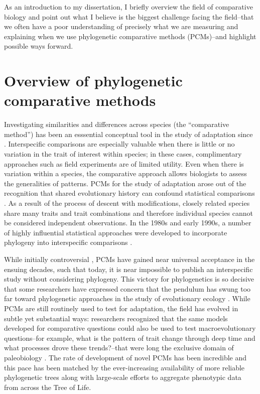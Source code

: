 As an introduction to my dissertation, I briefly overview the field of comparative biology \citep[for a more comprehensive discussion, see][]{PennellHarmon} and point out what I believe is the biggest challenge facing the field--that we often have a poor understanding of precisely what we are measuring and explaining when we use phylogenetic comparative methods (PCMs)--and highlight possible ways forward.

\section{Overview of phylogenetic comparative methods}

Investigating similarities and differences across species (the ``comparative method'') has been an esssential conceptual tool in the study of adaptation since \citet{Darwin1859}. Interspecific comparisons are especially valuable when there is little or no variation in the trait of interest within species; in these cases, complimentary approaches such as field experiments are of limited utility. Even when there is variation within a species, the comparative approach allows biologists to assess the generalities of patterns. PCMs for the study of adaptation arose out of the recognition that shared evolutionary history can confound statistical comparisons \citep{HarveyPagel1991}. As a result of the process of descent with modifications, closely related species share many traits and trait combinations and therefore individual species cannot be considered independent observations. In the 1980s and early 1990s, a number of highly influential statistical approaches were developed to incorporate phylogeny into interspecific comparisons \citep{Ridley1983, Felsenstein1985, Grafen1989, Maddison1990, HarveyPagel1991, Lynch1991, Pagel1994}. 

While initially controversial \citep[e.g.,][]{Westoby1995}, PCMs have gained near universal acceptance in the ensuing decades, such that today, it is near impossible to publish an interspecific study without considering phylogeny. This victory for phylogenetics is so decisive that some researchers have expressed concern that the pendulum has swung too far toward phylogenetic approaches in the study of evolutionary ecology \citep{Losos2011}. While PCMs are still routinely used to test for adaptation, the field has evolved in subtle yet substantial ways: researchers recognized that the same models developed for comparative questions could also be used to test macroevolutionary questions--for example, what is the pattern of trait change through deep time and what processes drove these trends?--that were long the exclusive domain of paleobiology \citep{HansenMartins1996, Hansen1997, Schluter1997, Pagel1997, MooersSchluter1998, Pagel1999, Mooers1999}. The rate of development of novel PCMs has been incredible and this pace has been matched by the ever-increasing availability of more reliable phylogenetic trees along with large-scale efforts to aggregate phenotypic data from across the Tree of Life.

